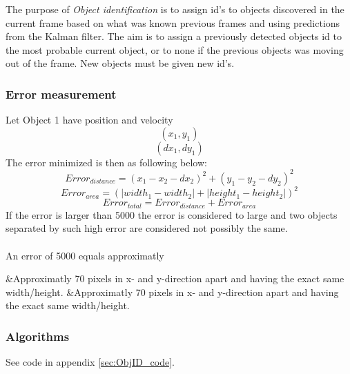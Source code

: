 The purpose of \emph{Object identification} is to assign id's to objects discovered in the current frame based on what was known previous frames and using predictions from the Kalman filter. The aim is to assign a previously detected objects id to the most probable current object, or to none if the previous objects was moving out of the frame. New objects must be given new id's. 

\subsubsection{Error measurement}
Let Object 1 have position and velocity
$$
(x_1, y_1)
$$
$$
(dx_1, dy_1)
$$
The error minimized is then as following below:
$$
  Error_{distance} = (x_1 - x_2 - dx_2)^2 + (y_1 - y_2 - dy_2)^2
$$
$$
  Error_{area} = (|width_1 - width_2| + |height_1 - height_2|)^2
$$
$$
  Error_{total} = Error_{distance} + Error_{area}
$$
If the error is larger than 5000 the error is considered to large and two objects separated by such high error are considered not possibly the same.
\\\\
An error of 5000 equals approximatly
\begin{easylist}
&Approximatly 70 pixels in x- and y-direction apart and having the exact same width/height.
&Approximatly 70 pixels in x- and y-direction apart and having the exact same width/height.
\end{easylist}


\subsubsection{Algorithms}
See code in appendix \ref{sec:ObjID_code}. %

